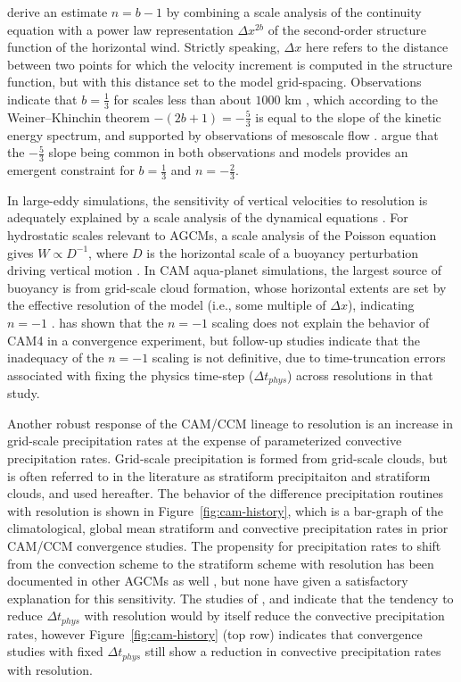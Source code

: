 \documentclass[times]{qjrms4}
\begin{document}
\cite{RETAL2016CD} derive an estimate $n= b-1$ by combining a scale analysis of the continuity equation with a power law representation $\Delta x^{2b}$ of the second-order structure function of the horizontal wind. Strictly speaking, $\Delta x$ here refers to the distance between two points for which the velocity increment is computed in the structure function, but with this distance set to the model grid-spacing. Observations indicate that $b=\frac{1}{3}$ for scales less than about $1000$ km \citep{CETAL1999JGR}, which according to the Weiner–Khinchin theorem $- \left( 2b+1 \right) = -\frac{5}{3}$ is equal to the slope of the kinetic energy spectrum, and supported by observations of mesoscale flow \citep{NG1985JAS}. \cite{RETAL2016CD} argue that the $-\frac{5}{3}$ slope being common in both observations and models provides an emergent constraint for $b=\frac{1}{3}$ and $n= -\frac{2}{3}$.

In large-eddy simulations, the sensitivity of vertical velocities to resolution is adequately explained by a scale analysis of the dynamical equations \citep{WETAL1997MWR,PG2006JAS,JR2016QJRMS}. For hydrostatic scales relevant to AGCMs, a scale analysis of the Poisson equation gives $W \propto D^{-1}$, where $D$ is the horizontal scale of a buoyancy perturbation driving vertical motion \citep{HR2018JAMES}. In CAM aqua-planet simulations, the largest source of buoyancy is from grid-scale cloud formation, whose horizontal extents are set by the effective resolution of the model (i.e., some multiple of $\Delta x$), indicating $n=-1$ \citep{HR2018JAMES}. \cite{HR2017JCLIM} has shown that the $n=-1$ scaling does not explain the behavior of CAM4 in a convergence experiment, but follow-up studies \citep{HR2018JAMES,HETAL2019JAMES} indicate that the inadequacy of the $n=-1$ scaling is not definitive, due to time-truncation errors associated with fixing the physics time-step ($\Delta t_{phys}$) across resolutions in that study.

Another robust response of the CAM/CCM lineage to resolution is an increase in grid-scale precipitation rates at the expense of parameterized convective precipitation rates. Grid-scale precipitation is formed from grid-scale clouds, but is often referred to in the literature as stratiform precipitaiton and stratiform clouds, and used hereafter. The behavior of the difference precipitation routines with resolution is shown in Figure~\ref{fig:cam-history}, which is a bar-graph of the climatological, global mean stratiform and convective precipitation rates in prior CAM/CCM convergence studies. The propensity for precipitation rates to shift from the convection scheme to the stratiform scheme with resolution has been documented in other AGCMs as well \citep{PS2002CD,TETAL2018CD}, but none have given a satisfactory explanation for this sensitivity. The studies of \cite{KW1991JGR}, \cite{WETAL1995CD} and \cite{W2013QJRMS} indicate that the tendency to reduce $\Delta t_{phys}$ with resolution would by itself reduce the convective precipitation rates, however Figure~\ref{fig:cam-history} (top row) indicates that convergence studies with fixed $\Delta t_{phys}$ still show a reduction in convective precipitation rates with resolution.
\end{document}
